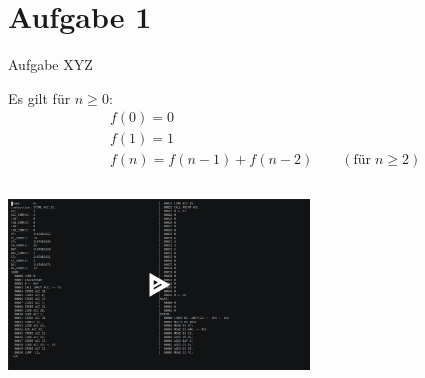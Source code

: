 
\section{Aufgabe 1}

\setcounter{exercise}{1}

\begin{frame}{Aufgabe \thesection}{XYZ}
    \begin{exercisenoinc}
      Es gilt für $n\ge 0$:
      \begin{align*}
        &f(0) = 0\\
        &f(1) = 1\\
        &f(n)={f(n-1)+f(n-2)}\qquad (\text{für}\;n\geq2)
      \end{align*}
    \end{exercisenoinc}
    \begin{solutionnoinc}
    \end{solutionnoinc}
    \begin{solutionnoinc}
      \begin{columns}
        \begin{column}[t]{0.5\textwidth}
        \end{column}
        \begin{column}[t]{0.5\textwidth}
        \end{column}
      \end{columns}
      \vspace{0.5cm}
    \end{solutionnoinc}
    \begin{solutionnoinc}
      \centering
      \href{https://asciinema.org/a/583721}{\includegraphics[width=0.6\textwidth]{./figures/fib_video.png}}
    \end{solutionnoinc}
\end{frame}
